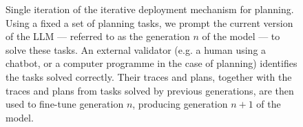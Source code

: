 \begin{figure}[t]
\caption{Single iteration of the iterative deployment mechanism for
  planning. Using a fixed a set of planning tasks, we prompt the current version
  of the LLM --- referred to as the generation $n$ of the model --- to solve
  these tasks. An external validator (e.g. a human using a chatbot, or a
  computer programme in the case of planning) identifies the tasks solved
  correctly. Their traces and plans, together with the traces and plans from tasks solved by
  previous generations, are then used to fine-tune generation $n$, producing
  generation $n+1$ of the model.}
\label{fig:pipeline}
\end{figure}
